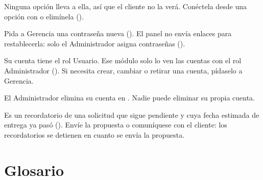   {Ninguna opción lleva a ella, así que el cliente no la verá. Conéctela desde una opción con
    o elimínela ().}

  {Pida a Gerencia una contraseña nueva (). El panel no envía enlaces para
   restablecerla: solo el Administrador asigna contraseñas ().}

  {Su cuenta tiene el rol Usuario. Ese módulo solo lo ven las cuentas con el rol Administrador
   (). Si necesita crear, cambiar o retirar una cuenta, pídaselo a Gerencia.}

  {El Administrador elimina su cuenta en . Nadie puede eliminar su
   propia cuenta.}

  {Es un recordatorio de una solicitud que sigue pendiente y cuya fecha estimada de entrega ya
   pasó (). Envíe la propuesta o comuníquese con el cliente: los
   recordatorios se detienen en cuanto se envía la propuesta.}

\chapter{Glosario}\label{ap:glosario}


